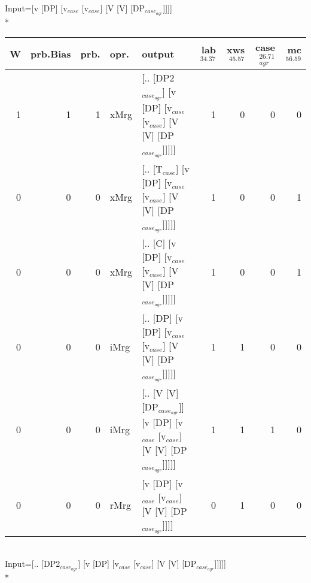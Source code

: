 \begingroup\scriptsize Input=[v [DP] [v$_{case}$ [v$_{case}$] [V [V] [DP$_{case_{agr}}$]]]]\\*
\begin{tabularx}{\linewidth}{rrrlXrrrr}
\hline
   W &   prb.Bias &   prb. & opr.   & output                                                                      &   lab$^{34.37}$ &   xws$^{45.57}$ &   case$_{agr}^{26.71}$ &   mc$^{56.59}$ \\
\hline
   1 &       1 &   1 & xMrg & [.. [DP2$_{case_{agr}}$] [v [DP] [v$_{case}$ [v$_{case}$] [V [V] [DP$_{case_{agr}}$]]]]]        &             1 &             0 &                  0 &            0 \\
   0 &       0 &   0 & xMrg & [.. [T$_{case}$] [v [DP] [v$_{case}$ [v$_{case}$] [V [V] [DP$_{case_{agr}}$]]]]]              &             1 &             0 &                  0 &            1 \\
   0 &       0 &   0 & xMrg & [.. [C] [v [DP] [v$_{case}$ [v$_{case}$] [V [V] [DP$_{case_{agr}}$]]]]]                   &             1 &             0 &                  0 &            1 \\
   0 &       0 &   0 & iMrg & [.. [DP] [v [DP] [v$_{case}$ [v$_{case}$] [V [V] [DP$_{case_{agr}}$]]]]]                  &             1 &             1 &                  0 &            0 \\
   0 &       0 &   0 & iMrg & [.. [V [V] [DP$_{case_{agr}}$]] [v [DP] [v$_{case}$ [v$_{case}$] [V [V] [DP$_{case_{agr}}$]]]]] &             1 &             1 &                  1 &            0 \\
   0 &       0 &   0 & rMrg & [v [DP] [v$_{case}$ [v$_{case}$] [V [V] [DP$_{case_{agr}}$]]]]                            &             0 &             1 &                  0 &            0 \\
\hline
\end{tabularx}\endgroup\\
\begingroup\scriptsize Input=[.. [DP2$_{case_{agr}}$] [v [DP] [v$_{case}$ [v$_{case}$] [V [V] [DP$_{case_{agr}}$]]]]]\\*
